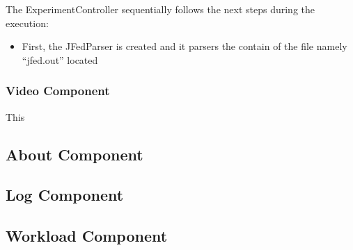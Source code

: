 The ExperimentController sequentially follows the next steps during the execution:
\begin{itemize}
\item First, the JFedParser is created and it parsers the contain of the file namely ``jfed.out'' located 

\end{itemize}

\subsubsection{Video Component}

This 

\subsection{About Component}

\subsection{Log Component}

\subsection{Workload Component}








